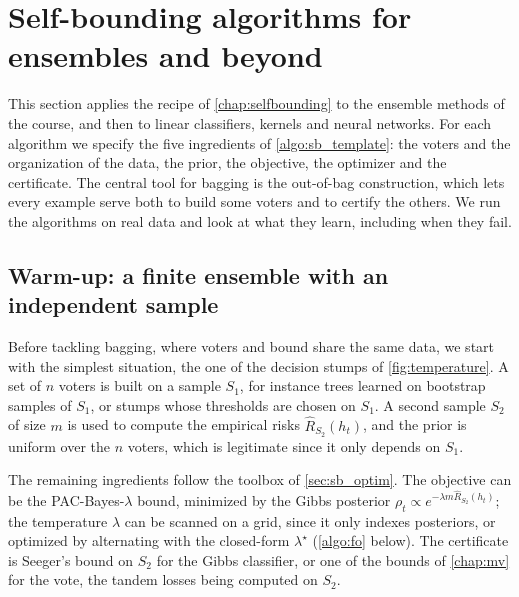 \section{Self-bounding algorithms for ensembles and beyond}
\label{chap:algos}

\begin{objectives}
This section applies the recipe of \cref{chap:selfbounding} to the ensemble
methods of the course, and then to linear classifiers, kernels and neural
networks. For each algorithm we specify the five ingredients of
\cref{algo:sb_template}: the voters and the organization of the data, the prior,
the objective, the optimizer and the certificate. The central tool for bagging is
the out-of-bag construction, which lets every example serve both to build some
voters and to certify the others. We run the algorithms on real data and look at
what they learn, including when they fail.
\end{objectives}

\subsection{Warm-up: a finite ensemble with an independent sample}

Before tackling bagging, where voters and bound share the same data, we start
with the simplest situation, the one of the decision stumps of \cref{fig:temperature}.
A set of $n$ voters is built on a sample $S_1$, for instance trees learned on
bootstrap samples of $S_1$, or stumps whose thresholds are chosen on $S_1$. A
second sample $S_2$ of size $m$ is used to compute the empirical risks
$\widehat R_{S_2}(h_t)$, and the prior is uniform over the $n$ voters, which is
legitimate since it only depends on $S_1$.

The remaining ingredients follow the toolbox of \cref{sec:sb_optim}. The objective can be the
PAC-Bayes-$\lambda$ bound, minimized by the Gibbs posterior
$\rho_t\propto e^{-\lambda m\widehat R_{S_2}(h_t)}$; the temperature $\lambda$ can be
scanned on a grid, since it only indexes posteriors, or optimized by alternating
with the closed-form $\lambda^\star$ (\cref{algo:fo} below). The certificate is
Seeger's bound on $S_2$ for the Gibbs classifier, or one of the bounds of
\cref{chap:mv} for the vote, the tandem losses being computed on $S_2$.

